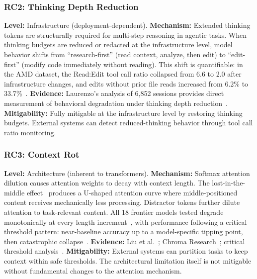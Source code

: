 \subsubsection{RC2: Thinking Depth Reduction}
\label{rc:thinking}

\textbf{Level:} Infrastructure (deployment-dependent).
\textbf{Mechanism:} Extended thinking tokens are structurally required for multi-step reasoning in agentic tasks.
When thinking budgets are reduced or redacted at the infrastructure level, model behavior shifts from ``research-first'' (read context, analyze, then edit) to ``edit-first'' (modify code immediately without reading).
This shift is quantifiable: in the AMD dataset, the Read:Edit tool call ratio collapsed from 6.6 to 2.0 after infrastructure changes, and edits without prior file reads increased from 6.2\% to 33.7\%~\cite{laurenzo2026amd}.
\textbf{Evidence:} Laurenzo's analysis of 6,852 sessions provides direct measurement of behavioral degradation under thinking depth reduction~\cite{laurenzo2026amd,laurenzo2026gist}.
\textbf{Mitigability:} Fully mitigable at the infrastructure level by restoring thinking budgets.
External systems can detect reduced-thinking behavior through tool call ratio monitoring.


\subsubsection{RC3: Context Rot}
\label{rc:context}

\textbf{Level:} Architecture (inherent to transformers).
\textbf{Mechanism:} Softmax attention dilution causes attention weights to decay with context length.
The lost-in-the-middle effect~\cite{liu2023lost} produces a U-shaped attention curve where middle-positioned content receives mechanically less processing.
Distractor tokens further dilute attention to task-relevant content.
All 18 frontier models tested degrade monotonically at every length increment~\cite{chroma2025contextrot}, with performance following a critical threshold pattern: near-baseline accuracy up to a model-specific tipping point, then catastrophic collapse~\cite{critical2025threshold}.
\textbf{Evidence:} Liu et al.~\cite{liu2023lost}; Chroma Research~\cite{chroma2025contextrot}; critical threshold analysis~\cite{critical2025threshold}.
\textbf{Mitigability:} External systems can partition tasks to keep context within safe thresholds.
The architectural limitation itself is not mitigable without fundamental changes to the attention mechanism.


